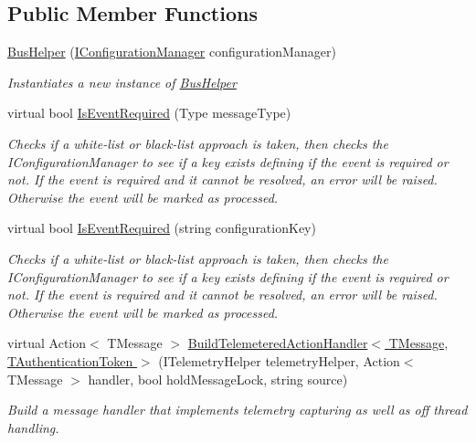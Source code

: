 \subsection*{Public Member Functions}
\begin{DoxyCompactItemize}
\item 
\hyperlink{classCqrs_1_1Bus_1_1BusHelper_a7799db8bc78bdd9ec25be5bd301d0b8a_a7799db8bc78bdd9ec25be5bd301d0b8a}{Bus\+Helper} (\hyperlink{interfaceCqrs_1_1Configuration_1_1IConfigurationManager}{I\+Configuration\+Manager} configuration\+Manager)
\begin{DoxyCompactList}\small\item\em Instantiates a new instance of \hyperlink{classCqrs_1_1Bus_1_1BusHelper}{Bus\+Helper} \end{DoxyCompactList}\item 
virtual bool \hyperlink{classCqrs_1_1Bus_1_1BusHelper_a28c675e976adbf348637ec6ff6410c1a_a28c675e976adbf348637ec6ff6410c1a}{Is\+Event\+Required} (Type message\+Type)
\begin{DoxyCompactList}\small\item\em Checks if a white-\/list or black-\/list approach is taken, then checks the I\+Configuration\+Manager to see if a key exists defining if the event is required or not. If the event is required and it cannot be resolved, an error will be raised. Otherwise the event will be marked as processed. \end{DoxyCompactList}\item 
virtual bool \hyperlink{classCqrs_1_1Bus_1_1BusHelper_a60a9603d5c6b7f29ee42491475714895_a60a9603d5c6b7f29ee42491475714895}{Is\+Event\+Required} (string configuration\+Key)
\begin{DoxyCompactList}\small\item\em Checks if a white-\/list or black-\/list approach is taken, then checks the I\+Configuration\+Manager to see if a key exists defining if the event is required or not. If the event is required and it cannot be resolved, an error will be raised. Otherwise the event will be marked as processed. \end{DoxyCompactList}\item 
virtual Action$<$ T\+Message $>$ \hyperlink{classCqrs_1_1Bus_1_1BusHelper_a7edd5b2ac0d46ce225e592f857f6d525_a7edd5b2ac0d46ce225e592f857f6d525}{Build\+Telemetered\+Action\+Handler$<$ T\+Message, T\+Authentication\+Token $>$} (I\+Telemetry\+Helper telemetry\+Helper, Action$<$ T\+Message $>$ handler, bool hold\+Message\+Lock, string source)
\begin{DoxyCompactList}\small\item\em Build a message handler that implements telemetry capturing as well as off thread handling. \end{DoxyCompactList}\item 

\end{DoxyCompactItemize}
